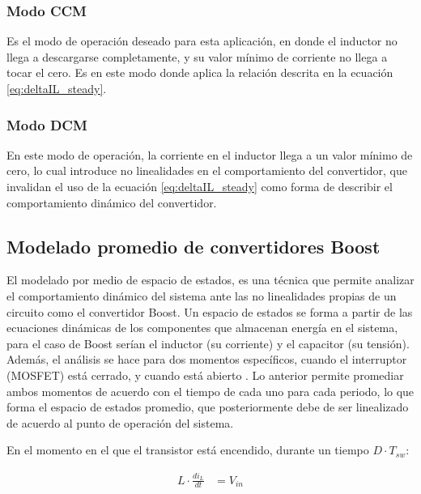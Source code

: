 \documentclass[conference]{IEEEtran}
\begin{document}
\subsubsection{Modo CCM} Es el modo de operación deseado para esta aplicación, en donde el inductor no llega
a descargarse completamente, y su valor mínimo de corriente no llega a tocar el cero. Es en este modo
donde aplica la relación descrita en la ecuación \ref{eq:deltaIL_steady}.

\subsubsection{Modo DCM} En este modo de operación, la corriente en el inductor llega a un valor mínimo de cero, 
lo cual introduce no linealidades en el comportamiento del convertidor, que invalidan el uso de la ecuación \ref{eq:deltaIL_steady} 
como forma de describir el comportamiento dinámico del convertidor. 





\subsection{Modelado promedio de convertidores Boost}
El modelado por medio de espacio de estados, es una técnica que permite analizar
el comportamiento dinámico del sistema ante las no linealidades propias de un circuito
como el convertidor Boost. 
Un espacio de estados se forma a partir de las ecuaciones dinámicas de los componentes que almacenan
energía en el sistema, para el caso de Boost serían el inductor (su corriente) y el capacitor (su tensión). Además, 
el análisis se hace para dos momentos específicos, cuando el interruptor (MOSFET) está cerrado, 
y cuando está abierto \cite{mohan2003power}. Lo anterior permite promediar ambos momentos de acuerdo con el tiempo
de cada uno para cada periodo, lo que forma el espacio de estados promedio, que posteriormente debe de ser linealizado
de acuerdo al punto de operación del sistema. 


En el momento en el que el transistor está encendido, durante un tiempo $D \cdot T_{sw}$:

\begin{equation}
\begin{aligned}
    L \cdot \frac{di_L}{dt} &= V_{in}  \\
\end{aligned}
\label{eq:inductor_voltage_on}
\end{equation}
\end{document}
